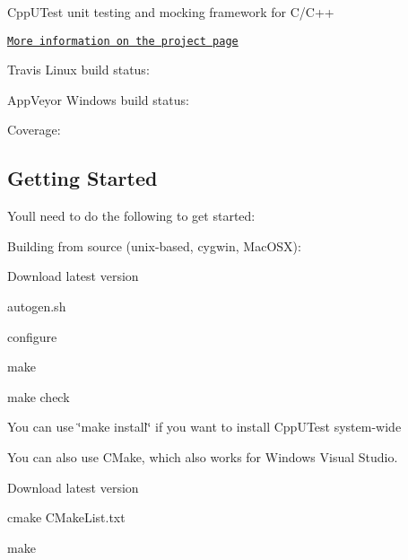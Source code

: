 Cpp\+U\+Test unit testing and mocking framework for C/\+C++

\href{http://cpputest.github.com}{\tt More information on the project page}

Travis Linux build status\+: \href{https://travis-ci.org/cpputest/cpputest}{\tt }

App\+Veyor Windows build status\+: \href{https://ci.appveyor.com/project/basvodde/cpputest}{\tt }

Coverage\+: \href{https://coveralls.io/github/cpputest/cpputest?branch=master}{\tt }

\subsection*{Getting Started}

You\textquotesingle{}ll need to do the following to get started\+:

Building from source (unix-\/based, cygwin, Mac\+O\+SX)\+:


\begin{DoxyItemize}
\item Download latest version
\item autogen.\+sh
\item configure
\item make
\item make check
\item You can use \char`\"{}make install\char`\"{} if you want to install Cpp\+U\+Test system-\/wide
\end{DoxyItemize}

You can also use C\+Make, which also works for Windows Visual Studio.


\begin{DoxyItemize}
\item Download latest version
\item cmake C\+Make\+List.\+txt
\item make
\end{DoxyItemize}


